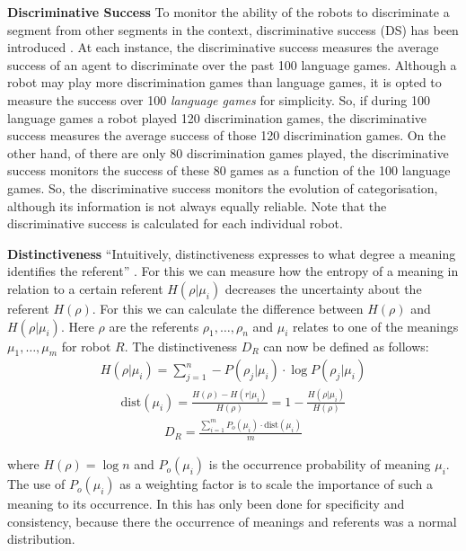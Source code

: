 \begin{description}
\item {\bf Discriminative Success} To monitor the ability of
the robots to discriminate a segment from other segments in the
context, discriminative success (DS) has been introduced \citep{steels:1996b}. At each instance, the discriminative success measures the average
success of an agent to discriminate over the past 100 language
games. Although a robot may play more discrimination games than
language games, it is opted to measure the success over 100 {\em
language games} for simplicity. So, if during 100 language games
a robot played 120 discrimination games, the discriminative success measures the average
success of those 120 discrimination games. On the other hand, of there are only 80 discrimination games played, the discriminative success monitors the success of these 80 games as a function of the 100 language games. So, the discriminative success
monitors the evolution of categorisation, although its information is not always equally reliable. Note that the discriminative success is calculated for each individual robot.
\item {\bf Distinctiveness} ``Intuitively, distinctiveness expresses to what degree a meaning identifies the referent'' \citep{dejong:2000}. For this we can measure how the entropy of a meaning in relation to a certain referent $H(\rho|\mu_i)$ decreases the uncertainty about the referent $H(\rho)$. For this we can calculate the difference between $H(\rho)$ and $H(\rho|\mu_i)$. Here $\rho$ are the referents $\rho_1,\ldots,\rho_n$ and $\mu_i$ relates to one of the meanings $\mu_1,\ldots,\mu_m$ for robot $R$. The distinctiveness $D_R$ can now be defined as follows:
\begin{eqnarray}
H(\rho|\mu_i)=\sum_{j=1}^n -P(\rho_j|\mu_i) \cdot \log P(\rho_j|\mu_i)
\end{eqnarray}
\begin{eqnarray}
\mbox{dist}(\mu_i)=\frac{H(\rho)-H(r|\mu_i)}{H(\rho)}=1-\frac{H(\rho|\mu_i)}{H(\rho)}
\end{eqnarray}
\begin{eqnarray}
D_R=\frac{\sum_{i=1}^m P_o(\mu_i) \cdot \mbox{dist}(\mu_i)}{m}
\end{eqnarray}


where $H(\rho)=\log n$ and $P_o(\mu_i)$ is the occurrence probability of meaning $\mu_i$. The use of $P_o(\mu_i)$ as a weighting factor is to scale the importance of such a meaning to its occurrence. In \citet{dejong:2000} this has only been done for specificity and consistency, because there the occurrence of meanings and referents was a normal distribution.


\end{description}
